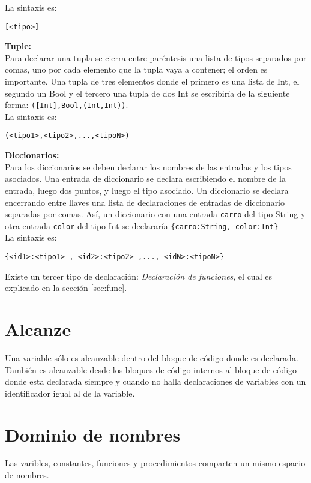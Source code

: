 \documentclass[12pt, spanish]{report}
\begin{document}
La sintaxis es:
\begin{verbatim}
[<tipo>]
\end{verbatim}

\textbf{Tuple:}\\
Para declarar una tupla se cierra entre par\'entesis una lista de
tipos separados por comas, uno por cada elemento que la tupla vaya a
contener; el orden es importante. Una tupla de tres elementos donde el
primero es una lista de Int, el segundo un Bool y el tercero una tupla
de dos Int se escribir\'ia de la siguiente forma:
\texttt{([Int],Bool,(Int,Int))}.\\

La sintaxis es:
\begin{verbatim}
(<tipo1>,<tipo2>,...,<tipoN>)
\end{verbatim}

\textbf{Diccionarios:}\\
Para los diccionarios se deben declarar los nombres de las entradas y
los tipos asociados. Una entrada de diccionario se declara escribiendo
el nombre de la entrada, luego dos puntos, y luego el tipo
asociado. Un diccionario se declara encerrando entre llaves una lista
de declaraciones de entradas de diccionario separadas por
comas. As\'i, un diccionario con una entrada \texttt{carro} del tipo
String y otra entrada \texttt{color} del tipo Int se declarar\'ia
\texttt{\{carro:String, color:Int\}}\\

La sintaxis es:
\begin{verbatim}
{<id1>:<tipo1> , <id2>:<tipo2> ,..., <idN>:<tipoN>}
\end{verbatim}

Existe un tercer tipo de declaraci\'on: \emph{Declaraci\'on de
  funciones}, el cual es explicado en la secci\'on \ref{sec:func}.

\section{Alcanze}
\label{sec:scope}
Una variable s\'olo es alcanzable dentro del bloque de c\'odigo donde
es declarada. Tambi\'en es alcanzable desde los bloques de c\'odigo
internos al bloque de c\'odigo donde esta declarada siempre y cuando
no halla declaraciones de variables con un identificador igual al de
la variable.

\section{Dominio de nombres}
\label{sec:namespaces}
Las varibles, constantes, funciones y procedimientos comparten un mismo
espacio de nombres.
\end{document}
